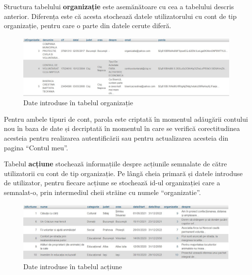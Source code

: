 \documentclass[12pt,a4paper]{report}
\begin{document}
\par
Structura tabelului \textbf{organizație} este asemănătoare cu cea a tabelului descris anterior. Diferența este că acesta stochează datele utilizatorului cu cont de tip organizație, pentru care o parte din datele cerute diferă.
\\
\begin{figure}[H]
\centering
  \includegraphics[width=1\linewidth]{./imagini/organizatie.jpg}
  \caption{Date introduse în tabelul organizație}
\end{figure}
\par
Pentru ambele tipuri de cont, parola este criptată în momentul adăugării contului nou în baza de date și decriptată în momentul în care se verifică corectitudinea acesteia pentru realizarea autentificării sau pentru actualizarea acesteia din pagina “Contul meu”.
\\
\par
Tabelul \textbf{acțiune} stochează informațiile despre acțiunile semnalate de către utilizatorii cu cont de tip organizație. Pe lângă cheia primară și datele introduse de utilizator, pentru fiecare acțiune se stochează id-ul organizației care a semnalat-o, prin intermediul cheii străine cu numele “organizatie”.
\\
\begin{figure}[H]
\centering
  \includegraphics[width=1\linewidth]{./imagini/actiune.jpg}
  \caption{Date introduse în tabelul acțiune}
\end{figure}

\newpage
\end{document}
